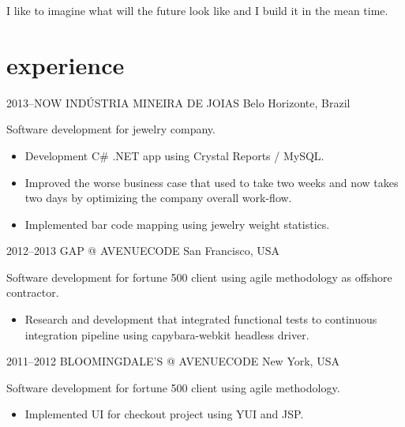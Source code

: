 \documentclass[]{friggeri-cv}
\begin{document}
I like to imagine what will the future look like and I build it in the mean time.

\section{experience}
\begin{entrylist}




\entry
{2013--NOW}
{INDÚSTRIA MINEIRA DE JOIAS}
{Belo Horizonte, Brazil}
{ Software development for jewelry company.

  \begin{itemize}
    \item Development C\# .NET app using  Crystal Reports / MySQL.
    \item Improved the worse business case that used to take two weeks and now takes two days by optimizing the company overall work-flow.
    \item Implemented bar code mapping using jewelry weight statistics.
  \end{itemize}
  }


\entry
{2012--2013}
{GAP @ AVENUECODE}
{San Francisco, USA}
{ Software development for fortune 500 client using agile methodology as offshore contractor.
  \begin{itemize}
    \item Research and development that integrated functional tests to continuous integration pipeline using capybara-webkit headless driver.
  \end{itemize}
}


\entry
{2011--2012}
{BLOOMINGDALE'S @ AVENUECODE}
{New York, USA}
{ Software development for fortune 500 client using agile methodology.

  \begin{itemize}
    \item Implemented UI for checkout project using YUI and JSP.
  \end{itemize}
}


\end{entrylist}
\end{document}
